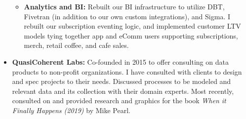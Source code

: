 \documentclass[a4paper,10pt,notitlepage]{article}
\begin{document}
\begin{itemize}
\begin{itemize}
                    \item \textbf{Analytics and BI:} Rebuilt our BI infrastructure to utilize DBT, Fivetran (in addition to our own custom integrations), and Sigma. I rebuilt our subscription eventing logic, and implemented customer LTV models tying together app and eComm users supporting subscriptions, merch, retail coffee, and cafe sales.
            \end{itemize}
        \vspace{-5pt}\item \textbf{QuasiCoherent Labs:} Co-founded in 2015 to offer consulting on data products to non-profit organizations. I have consulted with clients to design and spec projects to their needs. Discussed processes to be modeled and relevant data and its collection with their domain experts. Most recently, consulted on and provided research and graphics for the book \emph{When it Finally Happens (2019)} by Mike Pearl.
    \end{itemize}
\end{document}
